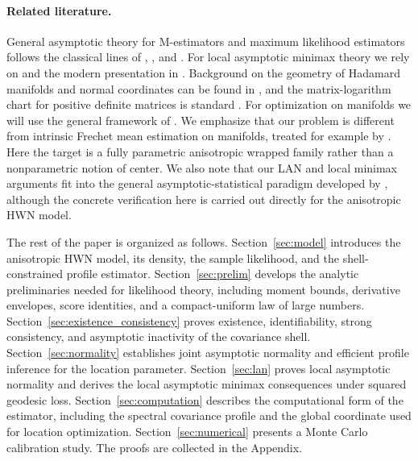 \documentclass[11pt]{article}
\begin{document}
\paragraph{Related literature.}
General asymptotic theory for M-estimators and maximum likelihood estimators follows the classical lines of \citet{wald_1949_NoteConsistencyMaximum}, \citet{hoadley_1971_AsymptoticPropertiesMaximum}, and \citet{vandervaart_1998_AsymptoticStatistics}. For local asymptotic minimax theory we rely on \citet{hajek_1972_LocalAsymptoticMinimax} and the modern presentation in \citet{vandervaart_1998_AsymptoticStatistics}. Background on the geometry of Hadamard manifolds and normal coordinates can be found in \citet{petersen_2006_RiemannianGeometry}, and the matrix-logarithm chart for positive definite matrices is standard \citep{bhatia_2009_PositiveDefiniteMatrices}. For optimization on manifolds we will use the general framework of \citet{absil_2008_OptimizationAlgorithmsMatrix}. We emphasize that our problem is different from intrinsic Frechet mean estimation on manifolds, treated for example by \citet{bhattacharya_2003_LargeSampleTheory}. Here the target is a fully parametric anisotropic wrapped family rather than a nonparametric notion of center. We also note that our LAN and local minimax arguments fit into the general asymptotic-statistical paradigm developed by \citet{lecam_2000_AsymptoticsStatistics}, although the concrete verification here is carried out directly for the anisotropic HWN model.


\medskip
The rest of the paper is organized as follows. Section~\ref{sec:model} introduces the anisotropic HWN model, its density, the sample likelihood, and the shell-constrained profile estimator. Section~\ref{sec:prelim} develops the analytic preliminaries needed for likelihood theory, including moment bounds, derivative envelopes, score identities, and a compact-uniform law of large numbers. Section~\ref{sec:existence_consistency} proves existence, identifiability, strong consistency, and asymptotic inactivity of the covariance shell. Section~\ref{sec:normality} establishes joint asymptotic normality and efficient profile inference for the location parameter. Section~\ref{sec:lan} proves local asymptotic normality and derives the local asymptotic minimax consequences under squared geodesic loss. Section~\ref{sec:computation} describes the computational form of the estimator, including the spectral covariance profile and the global coordinate used for location optimization. Section~\ref{sec:numerical} presents a Monte Carlo calibration study. The proofs are collected in the Appendix.
\end{document}
